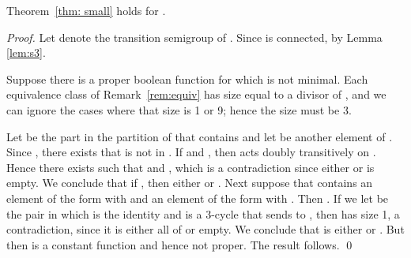 \documentclass{llncs}
\begin{document}
\begin{proposition}
Theorem~\ref{thm: small} holds for .
\end{proposition}
\begin{proof}
Let  denote the transition semigroup of .  Since  is connected,   by Lemma \ref{lem:s3}.

Suppose  there is a proper boolean function  for which  is not minimal.  
Each equivalence class of Remark~\ref{rem:equiv} has size equal to a divisor of , and we can ignore the cases where that size is 1 or 9; hence the size must be 3. 

Let  be the part in the partition of  that contains  and let  be another element of .  
Since , there exists  that is not in .  
If  and , then  acts doubly transitively on . 
Hence there exists  such that  and , which is a contradiction since either  or  is empty.   
We conclude that if , then either  or .  
Next suppose that  contains an element of the form  with   and an element of the form  with .  
Then
.  
If we let  be the pair in which  is the identity and  is a 3-cycle that sends  to , then   has size 1, a contradiction, since it is either all of  or empty.  We conclude that  is either  or .  But then  is a constant function and hence not proper.   The result follows.
\qed
\end{proof}
\end{document}
